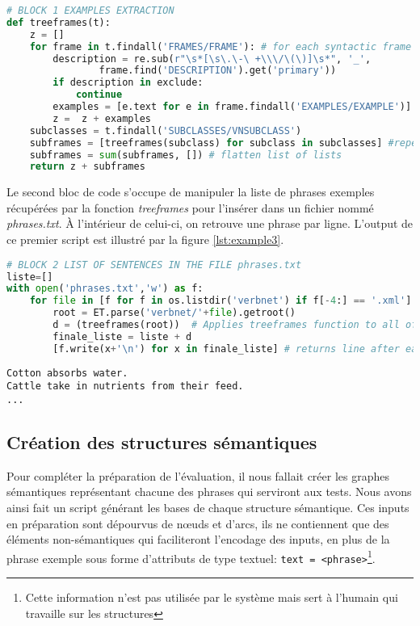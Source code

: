 \begin{lstlisting}[language=Python, caption = Extraction des phrases exemples de VerbNet, label=lst:example1]
# BLOCK 1 EXAMPLES EXTRACTION
def treeframes(t):
    z = []
    for frame in t.findall('FRAMES/FRAME'): # for each syntactic frame
        description = re.sub(r"\s*[\s\.\-\ +\\\/\(\)]\s*", '_',
				frame.find('DESCRIPTION').get('primary'))
        if description in exclude:
            continue    
        examples = [e.text for e in frame.findall('EXAMPLES/EXAMPLE')] # get the examples
        z =  z + examples 
    subclasses = t.findall('SUBCLASSES/VNSUBCLASS')
    subframes = [treeframes(subclass) for subclass in subclasses] #repeat operation for subclasses
    subframes = sum(subframes, []) # flatten list of lists
    return z + subframes
\end{lstlisting}

Le second bloc de code s'occupe de manipuler la liste de phrases exemples récupérées par la fonction \emph{treeframes} pour l'insérer dans un fichier nommé \emph{phrases.txt}. À l'intérieur de celui-ci, on retrouve une phrase par ligne. L'output de ce premier script est illustré par la figure \ref{lst:example3}.

\begin{lstlisting}[language=Python, caption = Mettre les exemples dans un fichier, label=lst:example2]
# BLOCK 2 LIST OF SENTENCES IN THE FILE phrases.txt
liste=[]
with open('phrases.txt','w') as f:
    for file in [f for f in os.listdir('verbnet') if f[-4:] == '.xml']:
        root = ET.parse('verbnet/'+file).getroot()       
        d = (treeframes(root))  # Applies treeframes function to all of VerbNet files
        finale_liste = liste + d  
        [f.write(x+'\n') for x in finale_liste] # returns line after each example
\end{lstlisting}



\begin{lstlisting}[language=mate, caption = Contenu du fichier phrases.txt, label=lst:example3]
Cotton absorbs water.
Cattle take in nutrients from their feed.
...
\end{lstlisting}

\subsection{Création des structures sémantiques}\label{sec:pythonstruc}

Pour compléter la préparation de l'évaluation, il nous fallait créer les graphes sémantiques représentant chacune des phrases qui serviront aux tests. Nous avons ainsi fait un script générant les bases de chaque structure sémantique. Ces inputs en préparation sont dépourvus de n\oe{}uds et d'arcs, ils ne contiennent que des éléments non-sémantiques qui faciliteront l'encodage des inputs, en plus de la phrase exemple sous forme d'attributs de type textuel: \texttt{text = <phrase>}\footnote{Cette information n'est pas utilisée par le système mais sert à l'humain qui travaille sur les structures}.

